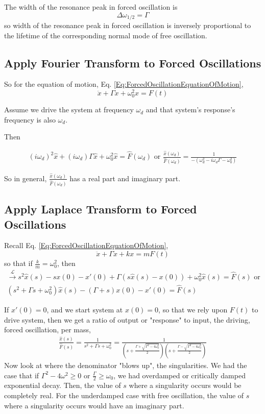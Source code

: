 \documentclass[10pt]{amsart}
\begin{document}
\begin{multicols*}{2}
The width of the resonance peak in forced oscillation is 
\[
\Delta \omega_{1/2} = \Gamma
\]
so width of the resonance peak in forced oscillation is inversely proportional to the lifetime of the corresponding normal mode of free oscillation.

\subsection{Apply Fourier Transform to Forced Oscillations}

So for the equation of motion, Eq. \ref{Eq:ForcedOscillationEquationOfMotion},
\[
\ddot{x} + \Gamma \dot{x} + \omega_0^2 x = F(t)
\]

Assume we drive the system at frequency $\omega_d$ and that system's response's frequency is also $\omega_d$.

Then

\[
\begin{gathered}
	(i\omega_d)^2 \widehat{x} + (i\omega_d) \Gamma \widehat{x} + \omega_0^2 \widehat{x} = \widehat{F}(\omega_d) \text{ or } \frac{ \widehat{x}(\omega_d) }{ \widehat{F}(\omega_d) } = \frac{1}{ - (\omega_d^2 - i \omega_d \Gamma - \omega_0^2) }
\end{gathered}
\]

So in general, $\frac{ \widehat{x}(\omega_d) }{ \widehat{F}(\omega_d) }$ has a real part and imaginary part.


\subsection{Apply Laplace Transform to Forced Oscillations}

Recall Eq. \ref{Eq:ForcedOscillationEquationOfMotion},
\[
\ddot{x} + \Gamma \dot{x} + k x = mF(t)
\]
so that if $\frac{k}{m} = \omega_0^2$, then
\[
\begin{gathered}
	\xrightarrow{ \mathcal{L}} s^2 \widehat{x}(s) - s x(0) - x'(0) + \Gamma (s\widehat{x}(s) - x(0)) + \omega_0^2 \widehat{x}(s) = \widehat{F}(s) \text{ or } \\
	(s^2 + \Gamma s + \omega_0^2) \widehat{x}(s) - (\Gamma + s) x(0) - x'(0) = \widehat{F}(s)
\end{gathered}
\]

If $x'(0) = 0$, and we start system at $x(0) =0$, so that we rely upon $F(t)$ to drive system, then we get a ratio of output or "response" to input, the driving, forced oscillation, per mass,
\[
\begin{gathered}
	\frac{ \widehat{x}(s) }{ \widehat{F}(s) } = \frac{1}{ s^2 + \Gamma s + \omega_0^2 } = \frac{1}{ \left( s + \frac{ \Gamma + \sqrt{ \Gamma^2 - 4 \omega_0^2 } }{ 2 } \right) \left( s + \frac{ \Gamma - \sqrt{ \Gamma^2 - 4 \omega_0^2 } }{ 2} \right) }
\end{gathered}
\]
Now look at where the denominator "blows up", the singularities. We had the case that if $\Gamma^2 - 4\omega^2 \geq 0 $ or $\frac{\Gamma}{2} \geq \omega_0$, we had overdamped or critically damped exponential decay. Then, the value of $s$ where a singularity occurs would be completely real. For the underdamped case with free oscillation, the value of $s$ where a singularity occurs would have an imaginary part.


\end{multicols*}
\end{document}
